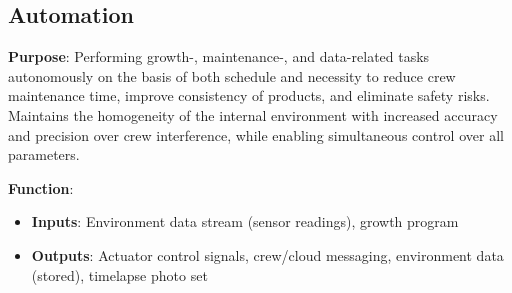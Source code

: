 \subsection{Automation}
\label{sec:automation}

\textbf{Purpose}: Performing growth-, maintenance-, and data-related tasks autonomously on the basis of both schedule and necessity to reduce crew maintenance time, improve consistency of products, and eliminate safety risks. Maintains the homogeneity of the internal environment with increased accuracy and precision over crew interference, while enabling simultaneous control over all parameters.

\textbf{Function}:
\begin{itemize}
    \item \textbf{Inputs}: Environment data stream (sensor readings), growth program
    \item \textbf{Outputs}: Actuator control signals, crew/cloud messaging, environment data (stored), timelapse photo set
\end{itemize}


